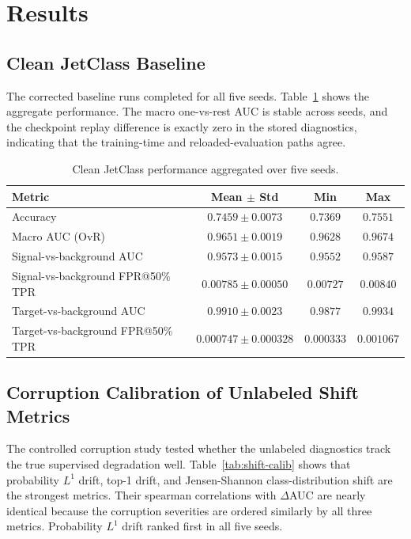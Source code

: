 \section{Results}
\label{sec:results}

\subsection{Clean JetClass Baseline}

The corrected baseline runs completed for all five seeds. Table~\ref{tab:clean-aggregate} shows the aggregate performance. The macro one-vs-rest AUC is stable across seeds, and the checkpoint replay difference is exactly zero in the stored diagnostics, indicating that the training-time and reloaded-evaluation paths agree.


\begin{table}[t]
\centering
\caption{Clean JetClass performance aggregated over five seeds.}
\label{tab:clean-aggregate}
\begin{tabular}{lccc}
\toprule
Metric & Mean $\pm$ Std & Min & Max \\
\midrule
Accuracy & $0.7459 \pm 0.0073$ & $0.7369$ & $0.7551$ \\
Macro AUC (OvR) & $0.9651 \pm 0.0019$ & $0.9628$ & $0.9674$ \\
Signal-vs-background AUC & $0.9573 \pm 0.0015$ & $0.9552$ & $0.9587$ \\
Signal-vs-background FPR@50\% TPR & $0.00785 \pm 0.00050$ & $0.00727$ & $0.00840$ \\
Target-vs-background AUC & $0.9910 \pm 0.0023$ & $0.9877$ & $0.9934$ \\
Target-vs-background FPR@50\% TPR & $0.000747 \pm 0.000328$ & $0.000333$ & $0.001067$ \\
\bottomrule
\end{tabular}
\end{table}

\subsection{Corruption Calibration of Unlabeled Shift Metrics}

The controlled corruption study tested whether the unlabeled diagnostics track the true supervised degradation well. Table~\ref{tab:shift-calib} shows that probability $L^1$ drift, top-1 drift, and Jensen-Shannon class-distribution shift are the strongest metrics. Their spearman correlations with $\Delta$AUC are nearly identical because the corruption severities are ordered similarly by all three metrics. Probability $L^1$ drift ranked first in all five seeds.

